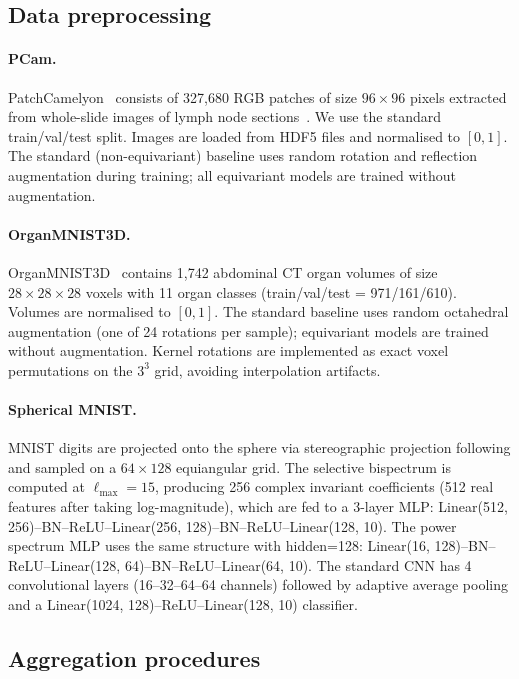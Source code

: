 \documentclass{article}
\begin{document}
\subsection{Data preprocessing}

\paragraph{PCam.}
PatchCamelyon~\citep{veeling2018rotation} consists of 327{,}680 RGB
patches of size $96 \times 96$ pixels extracted from whole-slide
images of lymph node sections~\citep{bejnordi2017camelyon}. We use
the standard train/val/test split. Images are loaded from HDF5 files
and normalised to $[0, 1]$. The standard (non-equivariant) baseline
uses random rotation and reflection augmentation during training; all
equivariant models are trained without augmentation.

\paragraph{OrganMNIST3D.}
OrganMNIST3D~\citep{medmnistv2} contains 1{,}742 abdominal CT organ
volumes of size $28 \times 28 \times 28$ voxels with 11 organ classes
(train/val/test = 971/161/610). Volumes are normalised to $[0, 1]$.
The standard baseline uses random octahedral augmentation (one of 24
rotations per sample); equivariant models are trained without
augmentation. Kernel rotations are implemented as exact voxel
permutations on the $3^3$ grid, avoiding interpolation artifacts.

\paragraph{Spherical MNIST.}
MNIST digits are projected onto the sphere via stereographic
projection following \citet{cohen2018spherical} and sampled on a
$64 \times 128$ equiangular grid. The selective bispectrum is
computed at $\ell_{\max} = 15$, producing 256 complex invariant
coefficients (512 real features after taking log-magnitude), which
are fed to a 3-layer MLP: Linear(512, 256)--BN--ReLU--Linear(256,
128)--BN--ReLU--Linear(128, 10). The power spectrum MLP uses the
same structure with hidden=128: Linear(16, 128)--BN--ReLU--Linear(128,
64)--BN--ReLU--Linear(64, 10). The standard CNN has 4 convolutional
layers (16--32--64--64 channels) followed by adaptive average pooling
and a Linear(1024, 128)--ReLU--Linear(128, 10) classifier.

\subsection{Aggregation procedures}
\end{document}
